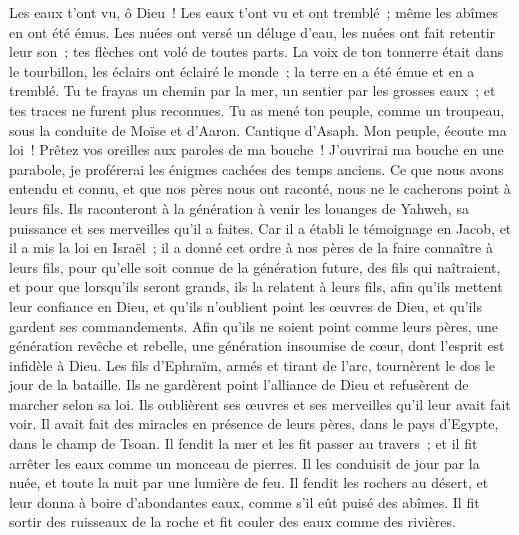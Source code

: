 \begin{multicols}{2}
Les eaux t'ont vu, ô Dieu~! Les eaux t'ont vu et ont tremblé~; même les abîmes en ont été émus.
Les nuées ont versé un déluge d'eau, les nuées ont fait retentir leur son~; tes flèches ont volé de toutes parts.
La voix de ton tonnerre était dans le tourbillon, les éclairs ont éclairé le monde~; la terre en a été émue et en a tremblé.
Tu te frayas un chemin par la mer, un sentier par les grosses eaux~; et tes traces ne furent plus reconnues.
Tu as mené ton peuple, comme un troupeau, sous la conduite de Moïse et d'Aaron.
\VerseOne{}Cantique d'Asaph. Mon peuple, écoute ma loi~! Prêtez vos oreilles aux paroles de ma bouche~!
J'ouvrirai ma bouche en une parabole, je proférerai les énigmes cachées des temps anciens.
Ce que nous avons entendu et connu, et que nos pères nous ont raconté,
nous ne le cacherons point à leurs fils. Ils raconteront à la génération à venir les louanges de Yahweh, sa puissance et ses merveilles qu'il a faites.
Car il a établi le témoignage en Jacob, et il a mis la loi en Israël~; il a donné cet ordre à nos pères de la faire connaître à leurs fils,
pour qu'elle soit connue de la génération future, des fils qui naîtraient, et pour que lorsqu'ils seront grands, ils la relatent à leurs fils,
afin qu'ils mettent leur confiance en Dieu, et qu'ils n'oublient point les œuvres de Dieu, et qu'ils gardent ses commandements.
Afin qu'ils ne soient point comme leurs pères, une génération revêche et rebelle, une génération insoumise de cœur, dont l'esprit est infidèle à Dieu.
Les fils d'Ephraïm, armés et tirant de l'arc, tournèrent le dos le jour de la bataille.
Ils ne gardèrent point l'alliance de Dieu et refusèrent de marcher selon sa loi.
Ils oublièrent ses œuvres et ses merveilles qu'il leur avait fait voir.
Il avait fait des miracles en présence de leurs pères, dans le pays d'Egypte, dans le champ de Tsoan.
Il fendit la mer et les fit passer au travers~; et il fit arrêter les eaux comme un monceau de pierres.
Il les conduisit de jour par la nuée, et toute la nuit par une lumière de feu.
Il fendit les rochers au désert, et leur donna à boire d'abondantes eaux, comme s'il eût puisé des abîmes.
Il fit sortir des ruisseaux de la roche et fit couler des eaux comme des rivières.

\end{multicols}
